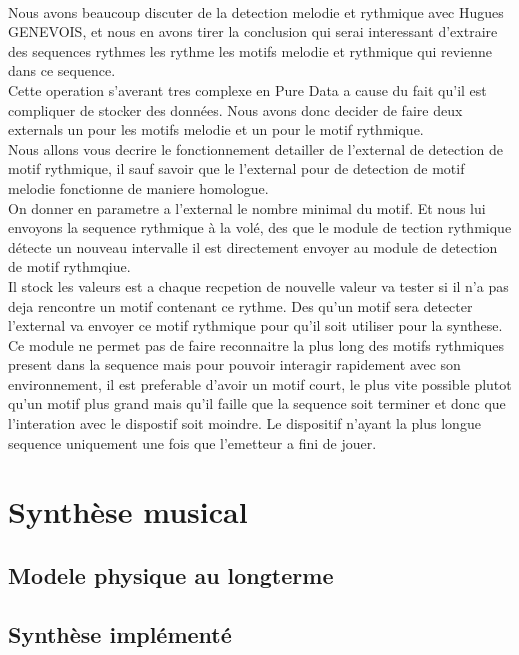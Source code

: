 \documentclass[a4paper, titlepage, oneside, 12pt]{article}%
\begin{document}
\paragraph{}
Nous avons beaucoup discuter de la detection melodie et rythmique avec Hugues GENEVOIS, et nous en avons tirer la conclusion qui serai interessant d'extraire des sequences rythmes les rythme les motifs melodie et rythmique qui revienne dans ce sequence.\\
Cette operation s'averant tres complexe en Pure Data a cause du fait qu'il est compliquer de stocker des données. Nous avons donc decider de faire deux externals un pour les motifs melodie et un pour le motif rythmique.\\
Nous allons vous decrire le fonctionnement detailler de l'external de detection de motif rythmique, il sauf savoir que le l'external pour de detection de motif melodie fonctionne de maniere homologue.\\
On donner en parametre a l'external le nombre minimal du motif. Et nous lui envoyons la sequence rythmique à la volé, des que le module de tection rythmique détecte un nouveau intervalle il est directement envoyer au module de detection de motif rythmqiue.\\
Il stock les valeurs est a chaque recpetion de nouvelle valeur va tester si il n'a pas deja rencontre un motif contenant ce rythme. Des qu'un motif sera detecter l'external va envoyer ce motif rythmique pour qu'il soit utiliser pour la synthese.\\
Ce module ne permet pas de faire reconnaitre la plus long des motifs rythmiques present dans la sequence mais pour pouvoir interagir rapidement avec son environnement, il est preferable d'avoir un motif court, le plus vite possible plutot qu'un motif plus grand mais qu'il faille que la sequence soit terminer et donc que l'interation avec le dispostif soit moindre. Le dispositif n'ayant la plus longue sequence uniquement une fois que l'emetteur a fini de jouer.

\section{Synthèse musical}
\subsection{Modele physique au longterme}

\subsection{Synthèse implémenté}
\end{document}
